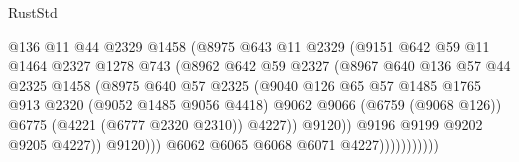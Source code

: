 \begin{lexlean}{RustStd}
\begin{coremodule}
{\begin{coremodule}
{{{{{{{{{{{{{{{{{{{{{{{{{{{{{{{                                @136
                                @11
                                @44
                                @2329
                                @1458
                                (@8975
                                  @643
                                  @11
                                  @2329
                                  (@9151
                                    @642
                                    @59
                                    @11
                                    @1464
                                    @2327
                                    @1278
                                    @743
                                    (@8962
                                      @642
                                      @59
                                      @2327
                                      (@8967
                                        @640
                                        @136
                                        @57
                                        @44
                                        @2325
                                        @1458
                                        (@8975
                                          @640
                                          @57
                                          @2325
                                          (@9040
                                            @126
                                            @65
                                            @57
                                            @1485
                                            @1765
                                            @913
                                            @2320
                                            (@9052 @1485 @9056 @4418)
                                            @9062
                                            @9066
                                            (@6759 (@9068 @126))
                                            @6775
                                            (@4221 (@6777 @2320 @2310))
                                            @4227))
                                        @9120))
                                    @9196
                                    @9199
                                    @9202
                                    @9205
                                    @4227))
                                @9120)))
                          @6062
                          @6065
                          @6068
                          @6071
                          @4227)))))))))))
}}}}}}}}}}}}}}}}}}}}}}}}}}}}}}}
\end{coremodule}}
\end{coremodule}
\end{lexlean}

